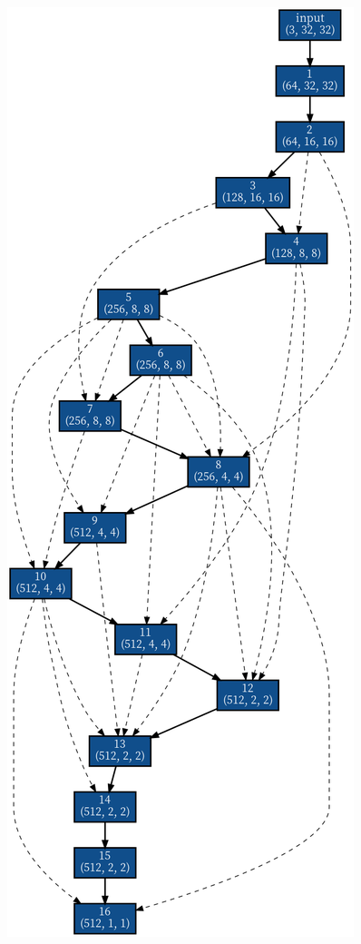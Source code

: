 \documentclass[twocolumn]{jarticle}     %
\begin{document}
\begin{figure}[tb]
 \begin{minipage}{0.33\hsize}
 	\begin{center}
 		\includegraphics[clip,scale=0.2]{50.png}

\end{center}
\end{minipage}
\end{figure}
\end{document}
